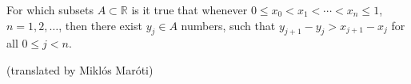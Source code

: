 For which subsets $A\subset \mathbb R$ is it true that whenever $0\leq x_0 < x_1 < \cdots < x_n\leq 1$, $n=1,2, \ldots$, then there exist $y_j\in A$ numbers, such that $y_{j+1}-y_j>x_{j+1}-x_j$ for all $0\leq j < n$.

(translated by Miklós Maróti)